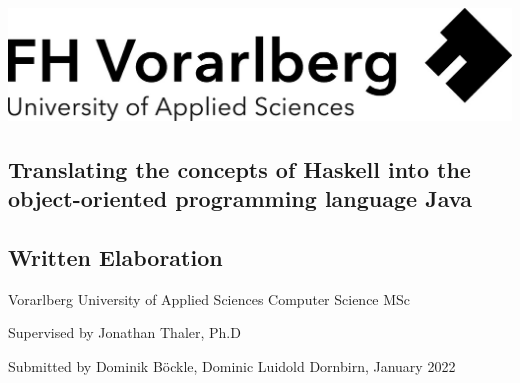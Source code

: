 \documentclass[a4paper,12pt,twoside]{scrreprt}
\begin{document}
\onehalfspacing %

{}
\cleardoublepage %
\thispagestyle{empty}
\begin{titlepage}
    \begin{flushright}
    \includegraphics[width=0.4\linewidth]{Logo-A3.jpg}
    \end{flushright}
    \begin{flushleft}
    \vspace{0.5cm}
    \section*{Translating the concepts of Haskell into the object-oriented programming language Java}
    \subsection*{Written Elaboration}

    \vspace{4cm}
    Vorarlberg University of Applied Sciences\newline
    Computer Science MSc

    \vspace{0.5cm}

    Supervised by\newline
    Jonathan Thaler, Ph.D

    \vspace{0.5cm}

    Submitted by\newline
    Dominik Böckle,\newline
    Dominic Luidold\newline\newline
    Dornbirn, January 2022
    \end{flushleft}
\end{titlepage}

\cleardoublepage %
\setcounter{tocdepth}{2}
\tableofcontents

\clearpage
{}
{}
\listoffigures

\clearpage
{}
{}
\end{document}
